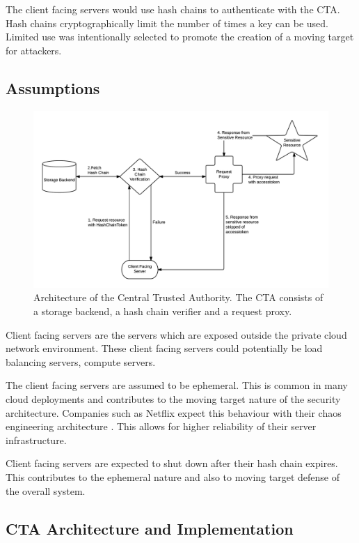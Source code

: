 \documentclass{sig-alternate-05-2015}
\begin{document}
The client facing servers would use hash chains to authenticate with the CTA. Hash chains cryptographically limit the number of times a key can be used. Limited use was intentionally selected to promote the creation of a moving target for attackers.

\subsection*{Assumptions}

\begin{figure}[!ht]
  \centering
  \includegraphics[keepaspectratio=true,scale=0.8]{cta_architecture}
  \caption{Architecture of the Central Trusted Authority. The CTA consists of a storage backend, a hash chain verifier and a request proxy.}
  \label{fig:ctaarchitecture}
\end{figure}


Client facing servers are the servers which are exposed outside the private cloud network environment. These client facing servers could potentially be load balancing servers, compute servers.

The client facing servers are assumed to be ephemeral. This is common in many cloud deployments \cite{vaquero_dynamically_2011} and contributes to the moving target nature of the security architecture. Companies such as Netflix expect this behaviour with their chaos engineering architecture \cite{basiri_chaos_2016}. This allows for higher reliability of their server infrastructure.

Client facing servers are expected to shut down after their hash chain expires. This contributes to the ephemeral nature and also to moving target defense of the overall system.

\subsection*{CTA Architecture and Implementation}
\end{document}
